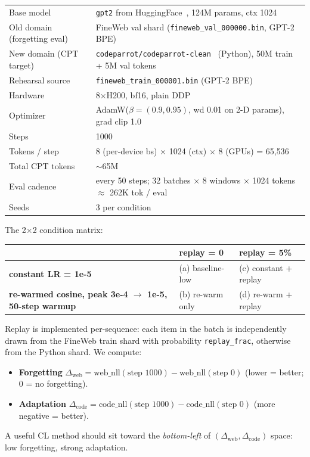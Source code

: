 \documentclass[10pt,letterpaper]{article}
\newcommand{\code}[1]{\texttt{\small #1}}
\begin{document}
\begin{center}
\small
\begin{tabular}{ll}
\toprule
Base model & \code{gpt2} from HuggingFace~\cite{radford_gpt2}, 124M params, ctx 1024 \\
Old domain (forgetting eval) & FineWeb val shard (\code{fineweb\_val\_000000.bin}, GPT-2 BPE) \\
New domain (CPT target) & \code{codeparrot/codeparrot-clean}~\cite{codeparrot} (Python), 50M train + 5M val tokens \\
Rehearsal source & \code{fineweb\_train\_000001.bin} (GPT-2 BPE) \\
Hardware & 8\(\times\)H200, bf16, plain DDP \\
Optimizer & AdamW($\beta\!=\!(0.9, 0.95)$, wd 0.01 on 2-D params), grad clip 1.0 \\
Steps & 1000 \\
Tokens / step & 8 (per-device bs) $\times$ 1024 (ctx) $\times$ 8 (GPUs) = 65{,}536 \\
Total CPT tokens & $\sim$65M \\
Eval cadence & every 50 steps; 32 batches $\times$ 8 windows $\times$ 1024 tokens $\approx$ 262K tok / eval \\
Seeds & 3 per condition \\
\bottomrule
\end{tabular}
\end{center}

The 2\(\times\)2 condition matrix:

\begin{center}
\small
\begin{tabular}{lll}
\toprule
 & \textbf{replay = 0} & \textbf{replay = 5\%} \\
\midrule
\textbf{constant LR = 1e-5} & (a) baseline-low & (c) constant + replay \\
\textbf{re-warmed cosine, peak 3e-4 $\to$ 1e-5, 50-step warmup} & (b) re-warm only & (d) re-warm + replay \\
\bottomrule
\end{tabular}
\end{center}

Replay is implemented per-sequence: each item in the batch is independently drawn from the FineWeb train shard with probability \code{replay\_frac}, otherwise from the Python shard. We compute:
\begin{itemize}[leftmargin=1.4em,itemsep=2pt]
  \item \textbf{Forgetting} $\Delta_{\text{web}} = \text{web\_nll}(\text{step }1000) - \text{web\_nll}(\text{step }0)$ (lower = better; 0 = no forgetting).
  \item \textbf{Adaptation} $\Delta_{\text{code}} = \text{code\_nll}(\text{step }1000) - \text{code\_nll}(\text{step }0)$ (more negative = better).
\end{itemize}
A useful CL method should sit toward the \emph{bottom-left} of $(\Delta_{\text{web}}, \Delta_{\text{code}})$ space: low forgetting, strong adaptation.
\end{document}
